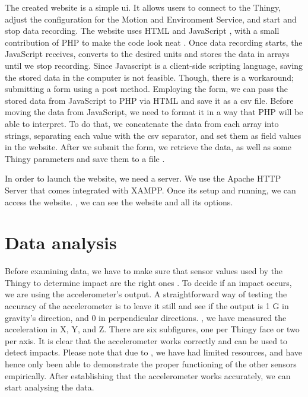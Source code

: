 The created website is a simple \gls{ui}. It allows users to connect to the Thingy, adjust the configuration for the Motion and Environment Service, and start and stop data recording. The website uses HTML  and JavaScript , with a small contribution of PHP to make the code look neat  . Once data recording starts, the JavaScript receives, converts to the desired units and stores the data in arrays until we stop recording. Since Javascript is a client-side scripting language, saving the stored data in the computer is not feasible. Though, there is a workaround; submitting a form using a post method. Employing the form, we can pass the stored data from JavaScript to PHP via HTML and save it as a \gls{csv} file. Before moving the data from JavaScript, we need to format it in a way that PHP will be able to interpret. To do that, we concatenate the data from each array into strings, separating each value with the \gls{csv} separator, and set them as field values in the website. After we submit the form, we retrieve the data, as well as some Thingy parameters and save them to a file .

In order to launch the website, we need a server. We use the Apache HTTP Server that comes integrated with XAMPP. Once its setup and running, we can access the website. , we can see the website and all its options.

\section{Data analysis}

Before examining data, we have to make sure that sensor values used by the Thingy to determine impact are the right ones . To decide if an impact occurs, we are using the accelerometer's output. A straightforward way of testing the accuracy of the accelerometer is to leave it still and see if the output is 1 G in gravity's direction, and 0 in perpendicular directions. , we have measured the acceleration in X, Y, and Z. There are six subfigures, one per Thingy face or two per axis. It is clear that the accelerometer works correctly and can be used to detect impacts. Please note that due to \cov, we have had limited resources, and have hence only been able to demonstrate the proper functioning of the other sensors empirically. After establishing that the accelerometer works accurately, we can start analysing the data.

